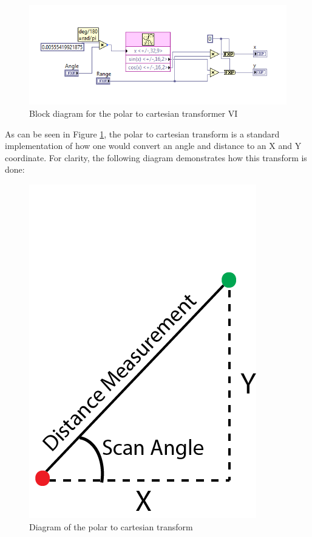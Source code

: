 \begin{figure}[h!]
\centering
\includegraphics[scale=0.9]{Photos/pol2cart.png}
\caption{Block diagram for the polar to cartesian transformer VI}
\label{fig:pol2cart}
\end{figure}

\noindent As can be seen in Figure \ref{fig:pol2cart}, the polar to cartesian transform is a standard implementation of how one would convert an angle and distance to an X and Y coordinate. For clarity, the following diagram demonstrates how this transform is done:

\newpage

\begin{figure}[h!]
\centering
\includegraphics[scale=0.3]{Photos/pol2cart_diag.png}
\caption{Diagram of the polar to cartesian transform}
\label{fig:pol2cart_diag}
\end{figure}

